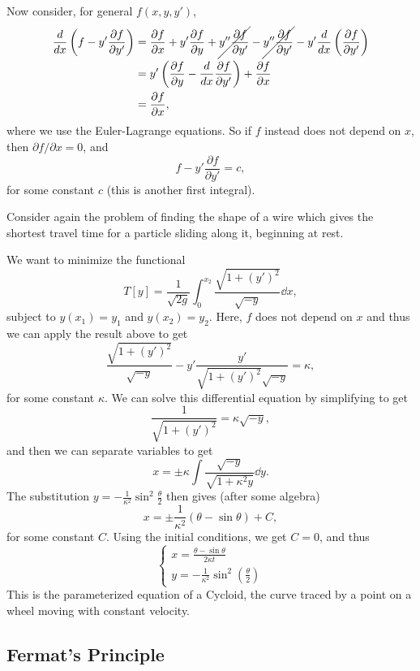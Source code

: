 \documentclass[a4paper]{scrartcl}
\begin{document}
Now consider, for general $f(x, y, y')$,
\begin{align*}
	\frac{d}{dx} \left(f - y' \frac{\partial f}{\partial y'}\right) &= \frac{\partial f}{\partial x} + y' \frac{\partial f}{\partial y} + \cancel{y'' \frac{\partial f}{\partial y'}} -\cancel{ y'' \frac{\partial f}{\partial y'}} - y' \frac{d}{dx}\left(\frac{\partial f}{\partial y'}\right) \\
	&= y' \left(\frac{\partial f}{\partial y} - \frac{d}{dx} \frac{\partial f}{\partial y'}\right) + \frac{\partial f}{\partial x} \\
	&= \frac{\partial f}{\partial x},
\end{align*}
where we use the Euler-Lagrange equations.
So if $f$ instead does not depend on $x$, then $\partial f/\partial x = 0$, and
$$
f - y' \frac{\partial f}{\partial y'} = c,
$$
for some constant $c$ (this is another first integral).

\begin{example}
	Consider again the problem of finding the shape of a wire which gives the shortest travel time for a particle sliding along it, beginning at rest.
	
	We want to minimize the functional
	$$
	T[y] = \frac{1}{\sqrt{2g}} \int_0^{x_2} \frac{\sqrt{1 + (y')^2}}{\sqrt{-y}} \dd x,
	$$
	subject to $y(x_1) =y_1$ and $y(x_2) = y_2$. Here, $f$ does not depend on $x$ and thus we can apply the result above to get 
	$$
		\frac{\sqrt{1 + (y')^2}}{\sqrt{-y}} - y' \frac{y'}{\sqrt{1 + (y')^2} \sqrt{-y}} = \kappa,
	$$
	for some constant $\kappa$. We can solve this differential equation by simplifying to get
	$$
	\frac{1}{\sqrt{1 + (y')^2}} = \kappa \sqrt{-y},
	$$
	and then we can separate variables to get
	$$
	x = \pm \kappa \int \frac{\sqrt{-y}}{\sqrt{1 + \kappa^2 y}} \dd y.
	$$
	The substitution $y = -\frac{1}{\kappa^2} \sin^2 \frac{\theta}{2}$ then gives (after some algebra)
	$$
	x = \pm \frac{1}{\kappa^2}(\theta - \sin \theta) + C,
	$$
	for some constant $C$. Using the initial conditions, we get $C = 0$, and thus
	$$
	\left\{\begin{array}{l}
		x=\frac{\theta-\sin \theta}{2 \kappa t} \\
		y=-\frac{1}{\kappa^{2}} \sin ^{2}\left(\frac{\theta}{2}\right)
		\end{array}\right.
	$$
	This is the parameterized equation of a Cycloid, the curve traced by a point on a wheel moving with constant velocity.
\end{example}


\subsection{Fermat's Principle}
\end{document}
